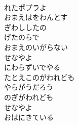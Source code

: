 \documentclass[10pt,b5j]{tarticle} %
\begin{document}
\vspace{1.5em} %
\newcommand{\linespace}{0.5em} %
\newcommand{\blocksize}{0.5\hsize} %
\newcommand{\itemmargin}{3em} %
\begin{enumerate} %
    \setlength{\itemindent}{\itemmargin} %
    \begin{minipage}[c]{\blocksize}
    
        \vspace{\linespace}
        \item~\\
        れたポプラよ\\
        おまえはをわんとす\\
        ぎわししたの\\
        げたのらで\\
        おまえのいがらない\\
        せなやよ\\
        にわらずいでやる\\
        たとえこのがわれども\\
        やらがうだろう\\
        のぎがわれども\\
        せなやよ\\
        おはにきている
        
    \end{minipage}
    \begin{minipage}[c]{\blocksize}
        

\end{minipage}
\end{enumerate}
\end{document}
